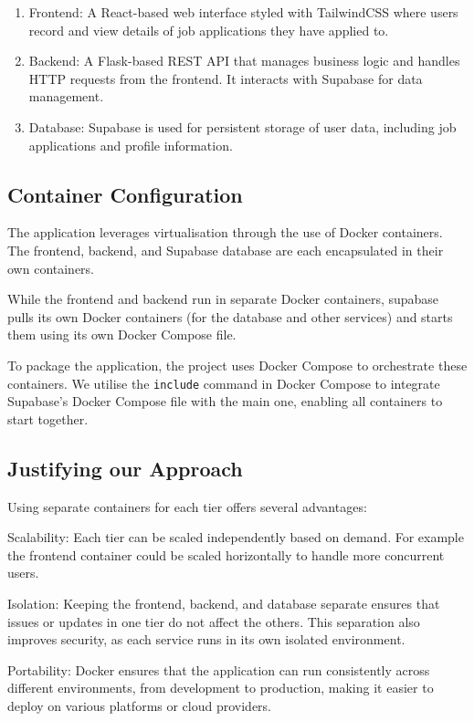 \documentclass[a4paper, 11pt]{article}
\begin{document}
\begin{enumerate}
    \item Frontend: A React-based web interface styled with TailwindCSS where users record and view details of job applications they have applied to.
    \item Backend: A Flask-based REST API that manages business logic and handles HTTP requests from the frontend. It interacts with Supabase for data management.
    \item Database: Supabase is used for persistent storage of user data, including job applications and profile information.
\end{enumerate}

\subsection*{Container Configuration}
The application leverages virtualisation through the use of Docker containers. The frontend, backend, and Supabase database are each encapsulated in their own containers. 

While the frontend and backend run in separate Docker containers, supabase pulls its own Docker containers (for the database and other services) and starts them using its own Docker Compose file.

To package the application, the project uses Docker Compose to orchestrate these containers. We utilise the \texttt{include} command in Docker Compose to integrate Supabase's Docker Compose file with the main one, enabling all containers to start together.

\subsection*{Justifying our Approach}
Using separate containers for each tier offers several advantages:

Scalability: Each tier can be scaled independently based on demand. For example the frontend container could be scaled horizontally to handle more concurrent users.

Isolation: Keeping the frontend, backend, and database separate ensures that issues or updates in one tier do not affect the others. This separation also improves security, as each service runs in its own isolated environment.

Portability: Docker ensures that the application can run consistently across different environments, from development to production, making it easier to deploy on various platforms or cloud providers.
\end{document}
